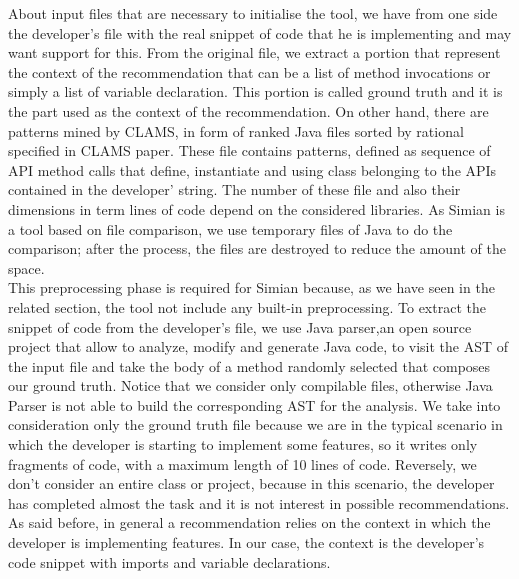 About input files that are necessary to initialise the tool, we have from one side the developer's file with the real snippet of code that he is implementing and may want support for this. From the original file, we extract a portion that represent the context of the recommendation that can be a list of method invocations or simply a list of variable declaration. This portion is called ground truth and it is the part used as the context of the recommendation. On other hand, there are patterns mined by CLAMS, in form of ranked Java files sorted by rational specified in CLAMS paper. These file contains patterns, defined as sequence of API method calls that define, instantiate and using class belonging to the APIs contained in the developer' string. The number of these file and also their dimensions in term lines of code depend on the considered libraries. As Simian is a tool based on file comparison, we use temporary files of Java to do the comparison; after the process, the files are destroyed to reduce the amount of the space. \\
This preprocessing phase is required for Simian because, as we have seen in the related section, the tool not include any built-in preprocessing. To extract the snippet of code from the developer's file, we use Java parser,an open source project that allow to analyze, modify and generate Java code, to visit the AST of the input file and take the body of a method randomly selected that composes our ground truth. Notice that we consider only compilable files, otherwise Java Parser is not able to build the corresponding AST for the analysis. We take into consideration only the ground truth file because we are in the typical scenario in which the developer is starting to implement some features, so it writes only fragments of code, with a maximum length of 10 lines of code. Reversely, we don't consider an entire class or project, because in this scenario, the developer has completed almost the task and it is not interest in possible recommendations. 
As said before, in general a recommendation relies on the context in which the developer is implementing features. In our case, the context is the developer's code snippet with imports and variable declarations.\\
